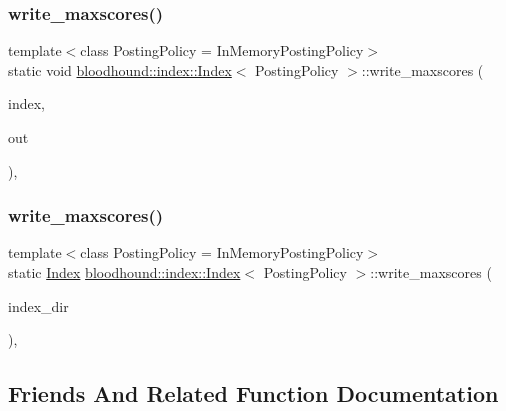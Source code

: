 \subsubsection{\texorpdfstring{write\+\_\+maxscores()}{write\_maxscores()}\hspace{0.1cm}{\footnotesize\ttfamily [1/2]}}
{\footnotesize\ttfamily template$<$class Posting\+Policy = In\+Memory\+Posting\+Policy$>$ \\
static void \mbox{\hyperlink{classbloodhound_1_1index_1_1Index}{bloodhound\+::index\+::\+Index}}$<$ Posting\+Policy $>$\+::write\+\_\+maxscores (\begin{DoxyParamCaption}\item[{\mbox{\hyperlink{classbloodhound_1_1index_1_1Index}{Index}}$<$ Posting\+Policy $>$ \&}]{index,  }\item[{fs\+::path}]{out }\end{DoxyParamCaption})\hspace{0.3cm}{\ttfamily [inline]}, {\ttfamily [static]}}

\mbox{\label{classbloodhound_1_1index_1_1Index_a46fcfc3c54ecf18d4ff58a240557b567}} 
\subsubsection{\texorpdfstring{write\+\_\+maxscores()}{write\_maxscores()}\hspace{0.1cm}{\footnotesize\ttfamily [2/2]}}
{\footnotesize\ttfamily template$<$class Posting\+Policy = In\+Memory\+Posting\+Policy$>$ \\
static \mbox{\hyperlink{classbloodhound_1_1index_1_1Index}{Index}} \mbox{\hyperlink{classbloodhound_1_1index_1_1Index}{bloodhound\+::index\+::\+Index}}$<$ Posting\+Policy $>$\+::write\+\_\+maxscores (\begin{DoxyParamCaption}\item[{fs\+::path}]{index\+\_\+dir }\end{DoxyParamCaption})\hspace{0.3cm}{\ttfamily [inline]}, {\ttfamily [static]}}



\subsection{Friends And Related Function Documentation}
\mbox{\label{classbloodhound_1_1index_1_1Index_a0343a97c005a2df437a955c308d376e6}} 
